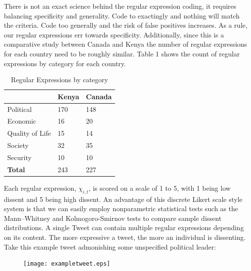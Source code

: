 \documentclass[12pt]{article}
\begin{document}
\begin{spacing}{1.5}
There is not an exact science behind the regular expression coding, it requires balancing specificity and generality. Code to exactingly and nothing will match the criteria. Code too generally and the risk of false positives increases. As a rule, our regular expressions err towards specificity. Additionally, since this is a comparative study between Canada and Kenya the number of regular expressions for each country need to be roughly similar. Table 1 shows the count of regular expressions by category for each country.     

\begin{table}[]
\centering
\begin{tabular}{lll}
\toprule
  & Kenya & Canada \\ \hline
Political          & 170    & 148   \\
Economic           & 16     & 20    \\
Quality of Life    & 15     & 14    \\
Society            & 32     & 35    \\
Security           & 10     & 10   \\
\textbf{Total}	   & 243 	& 227 \\ \hline
\end{tabular}
\caption{Regular Expressions by category}
\end{table}


Each regular expression, $\chi_{i,t}$, is scored on a scale of 1 to 5, with 1 being low dissent and 5 being high dissent. An advantage of this discrete Likert scale style system is that we can easily employ nonparametric statistical tests such as the Mann–Whitney and Kolmogoro-Smirnov tests to compare sample dissent distributions. A single Tweet can contain multiple regular expressions depending on its content. The more expressive a tweet, the more an individual is dissenting. Take this example tweet admonishing some unspecified political leader: 





\vspace{.5 em}

\begin{figure}[htb]
\centering 
\texttt{[image: exampletweet.eps]} 
\end{figure}
     

\end{spacing}
\end{document}
